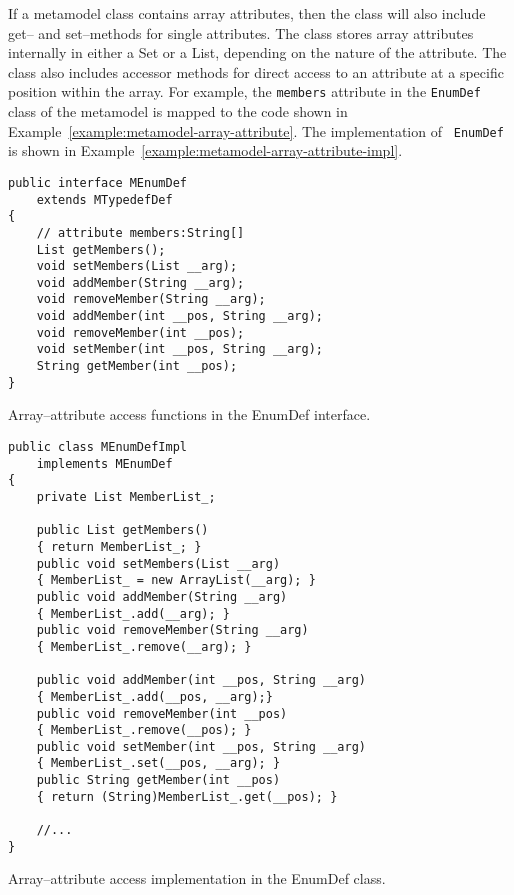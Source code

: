 If a metamodel class contains array attributes, then the class will also include
get-- and set--methods for single attributes. The class stores array attributes
internally in either a Set or a List, depending on the nature of the attribute.
The class also includes accessor methods for direct access to an attribute at a
specific position within the array. For example, the {\tt members} attribute in
the {\tt EnumDef} class of the metamodel is mapped to the code shown in
Example~\ref{example:metamodel-array-attribute}. The implementation of {\tt
EnumDef} is shown in Example~\ref{example:metamodel-array-attribute-impl}.

\begin{Example}
\begin{minifbox}
\begin{verbatim}
public interface MEnumDef
    extends MTypedefDef
{
    // attribute members:String[]
    List getMembers();
    void setMembers(List __arg);
    void addMember(String __arg);
    void removeMember(String __arg);
    void addMember(int __pos, String __arg);
    void removeMember(int __pos);
    void setMember(int __pos, String __arg);
    String getMember(int __pos);
}
\end{verbatim}
\end{minifbox}
\caption{Array--attribute access functions in the EnumDef interface.}
\label{example:metamodel-array-attribute}
\end{Example}

\begin{Example}
\begin{minifbox}
\begin{verbatim}
public class MEnumDefImpl
    implements MEnumDef
{
    private List MemberList_;

    public List getMembers()
    { return MemberList_; }
    public void setMembers(List __arg)
    { MemberList_ = new ArrayList(__arg); }
    public void addMember(String __arg)
    { MemberList_.add(__arg); }
    public void removeMember(String __arg)
    { MemberList_.remove(__arg); }

    public void addMember(int __pos, String __arg)
    { MemberList_.add(__pos, __arg);}
    public void removeMember(int __pos)
    { MemberList_.remove(__pos); }
    public void setMember(int __pos, String __arg)
    { MemberList_.set(__pos, __arg); }
    public String getMember(int __pos)
    { return (String)MemberList_.get(__pos); }

    //...
}
\end{verbatim}
\end{minifbox}
\caption{Array--attribute access implementation in the EnumDef class.}
\label{example:metamodel-array-attribute-impl}
\end{Example}

